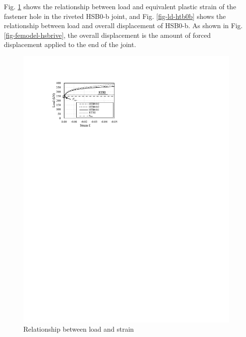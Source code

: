 Fig. \ref{fig-ls-ch4} shows the relationship between load and equivalent plastic strain of the fastener hole in the riveted HSB0-b joint, and Fig. \ref{fig-ld-htb0b} shows the relationship between load and overall displacement of HSB0-b. As shown in Fig. \ref{fig-femodel-hsbrive}, the overall displacement is the amount of forced displacement applied to the end of the joint.

\begin{figure}
    \centering
    \begin{minipage}[t]{0.48\textwidth}
    \includegraphics{imgs/ch4/LS-ch4.pdf}
    \caption{Relationship between load and strain}
    \label{fig-ls-ch4}
    \end{minipage}
    \begin{minipage}[t]{0.48\textwidth}

\end{minipage}
\end{figure}
